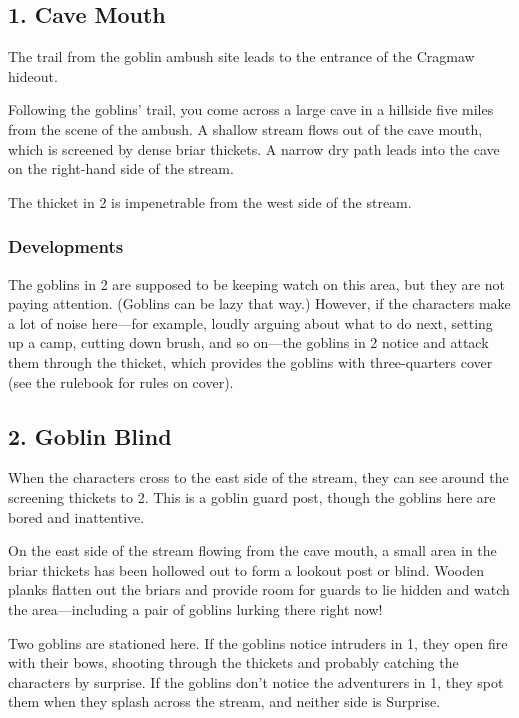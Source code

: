 \documentclass[10pt,a4paper,twoside,bg=print,twocolumn,openany,nodeprecatedcode]{dndbook}
\begin{document}
\subsection{1. Cave Mouth}
The trail from the goblin ambush site leads to the entrance of the Cragmaw hideout.

\begin{DndReadAloud}{}
Following the goblins' trail, you come across a large cave in a hillside five miles from the scene of the ambush. A shallow stream flows out of the cave mouth, which is screened by dense briar thickets. A narrow dry path leads into the cave on the right-hand side of the stream.

\end{DndReadAloud}

The thicket in 2 is impenetrable from the west side of the stream.

\subsubsection{Developments}
The goblins in 2 are supposed to be keeping watch on this area, but they are not paying attention. (Goblins can be lazy that way.) However, if the characters make a lot of noise here—for example, loudly arguing about what to do next, setting up a camp, cutting down brush, and so on—the goblins in 2 notice and attack them through the thicket, which provides the goblins with three-quarters cover (see the rulebook for rules on cover).

\subsection{2. Goblin Blind}
When the characters cross to the east side of the stream, they can see around the screening thickets to 2. This is a goblin guard post, though the goblins here are bored and inattentive.

\begin{DndReadAloud}{}
On the east side of the stream flowing from the cave mouth, a small area in the briar thickets has been hollowed out to form a lookout post or blind. Wooden planks flatten out the briars and provide room for guards to lie hidden and watch the area—including a pair of goblins lurking there right now!

\end{DndReadAloud}

Two goblins are stationed here. If the goblins notice intruders in 1, they open fire with their bows, shooting through the thickets and probably catching the characters by surprise. If the goblins don't notice the adventurers in 1, they spot them when they splash across the stream, and neither side is Surprise.
\end{document}
